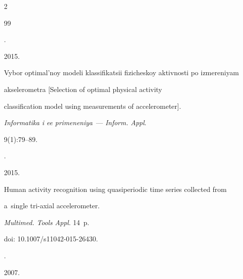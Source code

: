 




  \begin{multicols}{2}





\renewcommand{\bibname}{\protect\rmfamily References}







{\small\frenchspacing


 {%




 \begin{thebibliography}{99}







.


2015.


Vybor optimal'noy modeli klassifikatsii fizicheskoy aktivnosti po izmereniyam


  akselerometra [Selection of optimal physical activity


  classification model using measurements of accelerometer].


\textit{Informatika i ee primeneniya}~--- \textit{Inform. Appl}.


9(1):79--89.







.


2015.


Human activity recognition using quasiperiodic time series collected from 


a~single tri-axial accelerometer.


\textit{Multimed. Tools  Appl}. 14~p.


  doi: 10.1007/s11042-015-26430.







.


2007.



\end{thebibliography}}}
\end{multicols}
